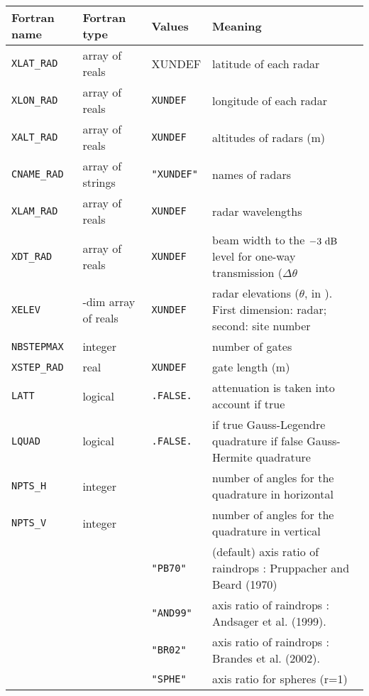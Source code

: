 \begin{center}
\begin{makeimage}
\begin{tabular}{|>{\centering}p{2.6cm}|>{\centering}p{3.5cm}|>{\centering}p{1.5cm}| p{8.2cm}|}\hline
Fortran name      &Fortran type&Values& Meaning\\\hline \hline
\tt XLAT\_RAD     &array of reals & XUNDEF&latitude of each radar\\\hline
\tt XLON\_RAD     &array of reals & \tt XUNDEF&longitude of each radar\\\hline
\tt XALT\_RAD     &array of reals & \tt XUNDEF&altitudes of radars (m)\\\hline
\tt CNAME\_RAD    &array of strings & \tt "XUNDEF"&names of radars\\\hline
\tt XLAM\_RAD     &array of reals &  \tt XUNDEF&radar wavelengths\\\hline
\tt XDT\_RAD      & array of reals&  \tt XUNDEF&beam width to the $-3\rm~dB$ level for one-way transmission ($\Delta\theta$\\\hline
\tt XELEV         & 2-dim array of reals&  \tt XUNDEF&radar elevations ($\theta$, in \char23). First dimension: radar; second: site number\\\hline
\tt NBSTEPMAX     &integer & -1&number of gates\\\hline
\tt XSTEP\_RAD    &real& \tt XUNDEF&gate length (m)\\\hline
\tt LATT          & logical &\tt.FALSE.& attenuation is taken into account if true\\\hline
\tt LQUAD         & logical & \tt.FALSE.&if true Gauss-Legendre quadrature if false Gauss-Hermite quadrature\\\hline
\tt NPTS\_H       & integer & 1&number of angles for the quadrature in horizontal\\\hline
\tt NPTS\_V       & integer & 1&number of angles for the quadrature in vertical\\\hline
\multirow{4}{*}{\tt CARF} &\multirow{2}{*}{ string} &\tt "PB70"& (default) axis ratio of raindrops : Pruppacher and Beard (1970)\\\cline{3-4}
&&\tt"AND99"&axis ratio of raindrops : Andsager et al. (1999). \\\cline{3-4}
&&\tt"BR02"&axis ratio of raindrops : Brandes et al. (2002). \\\cline{3-4}
&&\tt"SPHE"&axis ratio for spheres (r=1)\\\hline


\end{tabular}
\end{makeimage}
\end{center}
